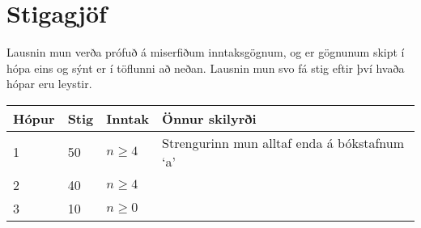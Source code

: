 \section*{Stigagjöf}
Lausnin mun verða prófuð á miserfiðum inntaksgögnum, og er gögnunum skipt í
hópa eins og sýnt er í töflunni að neðan. Lausnin mun svo fá stig eftir því
hvaða hópar eru leystir.

\begin{tabular}{|l|l|l|l|}
\hline
Hópur & Stig & Inntak & Önnur skilyrði \\ \hline
1     & 50 & $n \geq 4$ & Strengurinn mun alltaf enda á bókstafnum `a'\\ \hline
2     & 40 & $n \geq 4$ & \\ \hline
3     & 10 & $n \geq 0$ & \\ \hline
\end{tabular}
